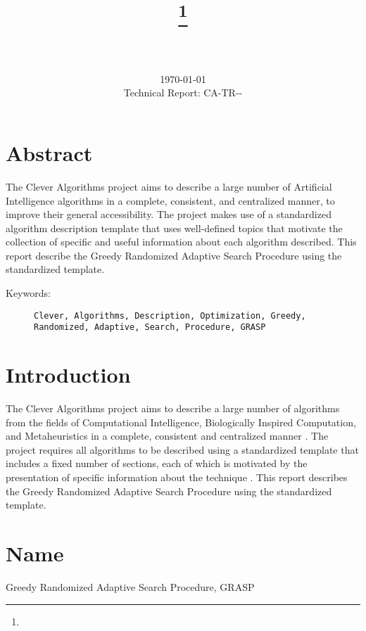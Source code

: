 \documentclass[a4paper, 11pt]{article}
\title{{\myreporttitle}\footnote{\myreportlicense}}
\author{\myreportauthor\\{\myreportemail}\\\small\myreportproject}
\date{\today\\{\small{Technical Report: CA-TR-{\myreportdate}-\myreportversion}}}
\begin{document}
\maketitle

\section*{Abstract} 
The Clever Algorithms project aims to describe a large number of Artificial Intelligence algorithms in a complete, consistent, and centralized manner, to improve their general accessibility. 
The project makes use of a standardized algorithm description template that uses well-defined topics that motivate the collection of specific and useful information about each algorithm described.
This report describe the Greedy Randomized Adaptive Search Procedure using the standardized template.

\begin{description}
	\item[Keywords:] {\small\texttt{Clever, Algorithms, Description, Optimization, Greedy, Randomized, Adaptive, Search, Procedure, GRASP}}
\end{description} 

\section{Introduction} 
\label{sec:intro}
The Clever Algorithms project aims to describe a large number of algorithms from the fields of Computational Intelligence, Biologically Inspired Computation, and Metaheuristics in a complete, consistent and centralized manner \cite{Brownlee2010}.
The project requires all algorithms to be described using a standardized template that includes a fixed number of sections, each of which is motivated by the presentation of specific information about the technique \cite{Brownlee2010a}.
This report describes the Greedy Randomized Adaptive Search Procedure using the standardized template.

\section{Name} 
\label{sec:name}
Greedy Randomized Adaptive Search Procedure, GRASP
\end{document}
